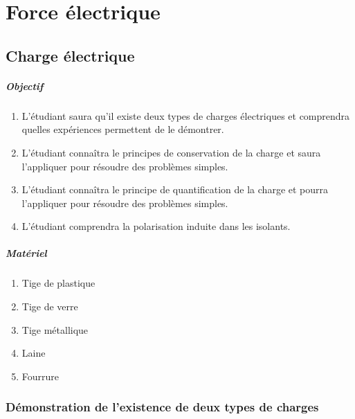 \chapter{Force électrique}

\section{Charge électrique}


\paragraph{Objectif}

\begin{enumerate}
  \item L'étudiant saura qu'il existe deux types de charges électriques et
    comprendra quelles expériences permettent de le démontrer.
  \item L'étudiant connaîtra le principes de conservation de la charge
    et saura l'appliquer pour résoudre des problèmes simples.
  \item L'étudiant connaîtra le principe de quantification de la charge et
    pourra l'appliquer pour résoudre des problèmes simples.
  \item L'étudiant comprendra la polarisation induite dans les isolants.
\end{enumerate}


\paragraph{Matériel}

\begin{enumerate}
  \item Tige de plastique
  \item Tige de verre
  \item Tige métallique
  \item Laine
  \item Fourrure
\end{enumerate}


\subsection*{Démonstration de l'existence de deux types de charges}



